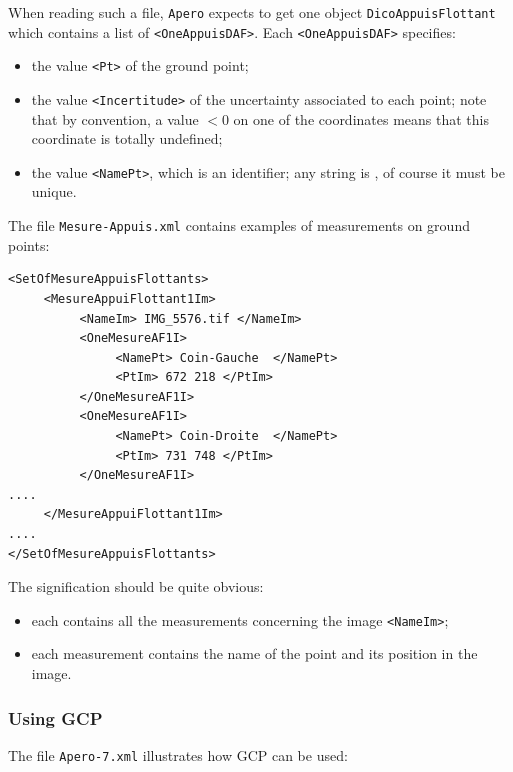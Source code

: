 When reading such a file, {\tt Apero} expects to get one object {\tt DicoAppuisFlottant}
which contains a list of {\tt <OneAppuisDAF>}. Each  {\tt <OneAppuisDAF>} specifies:

\begin{itemize}
    \item the value {\tt <Pt>} of the ground point;
    \item the value {\tt <Incertitude>} of the uncertainty associated to each
          point; note that by convention, a value $<0$ on one of the coordinates
          means that this coordinate is totally undefined;
     \item  the value {\tt <NamePt>}, which is an identifier; any string is , %
      of course it must be unique.
\end{itemize}

The file {\tt Mesure-Appuis.xml} contains examples of  measurements on
ground points:

{\scriptsize
\begin{verbatim}
<SetOfMesureAppuisFlottants>
     <MesureAppuiFlottant1Im>
          <NameIm> IMG_5576.tif </NameIm>
          <OneMesureAF1I>
               <NamePt> Coin-Gauche  </NamePt>
               <PtIm> 672 218 </PtIm>
          </OneMesureAF1I>
          <OneMesureAF1I>
               <NamePt> Coin-Droite  </NamePt>
               <PtIm> 731 748 </PtIm>
          </OneMesureAF1I>
....
     </MesureAppuiFlottant1Im>
....
</SetOfMesureAppuisFlottants>
\end{verbatim}
}


The signification should be quite obvious:

\begin{itemize}
    \item each {\tt <MesureAppuiFlottant1Im>} contains all the measurements concerning the image
         {\tt <NameIm>};
    \item each measurement contains the name of the point and its position in the image.
\end{itemize}


\subsubsection{Using GCP}

The file {\tt Apero-7.xml} illustrates how GCP can be used:

